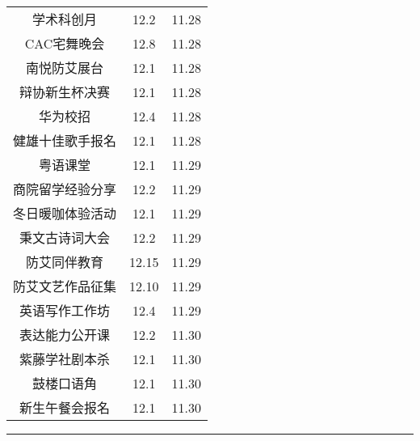 \documentclass[letterpaper, 12pt]{article}
\begin{document}
\begin{multicols}{2}
{\begin{longtable}{|c|c|c|}
    学术科创月 & 12.2 & 11.28\\
    CAC宅舞晚会 & 12.8 & 11.28\\
    南悦防艾展台 & 12.1 & 11.28\\
    辩协新生杯决赛 & 12.1 & 11.28\\
    华为校招 & 12.4 & 11.28\\
    健雄十佳歌手报名 & 12.1 & 11.28\\
    粤语课堂 & 12.1 & 11.29\\
    商院留学经验分享 & 12.2 & 11.29\\
    冬日暖咖体验活动 & 12.1 & 11.29\\
    秉文古诗词大会 & 12.2 & 11.29\\
    防艾同伴教育 & 12.15 & 11.29\\
    防艾文艺作品征集 & 12.10 & 11.29\\
    英语写作工作坊 & 12.4 & 11.29\\
    表达能力公开课 & 12.2 & 11.30\\
    紫藤学社剧本杀 & 12.1 & 11.30\\
    鼓楼口语角 & 12.1 & 11.30\\
    新生午餐会报名 & 12.1 & 11.30\\
    \hline
\end{longtable}
\unskip
\unpenalty
\unpenalty}\unvbox\colbbox
\end{multicols}
\hrule
\pagebreak
\end{document}

